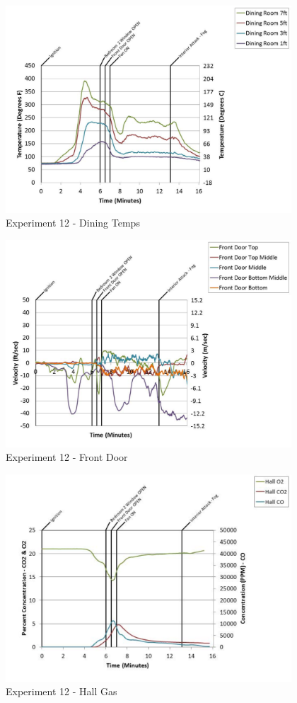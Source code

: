 \documentclass{article}
\begin{document}
\begin{appendices}
	\begin{figure}[h!]
		\centering
		\includegraphics[height=3.05in]{0_Images/Results_Charts/Exp_12_Charts/DiningTemps.pdf}
		\caption{Experiment 12 - Dining Temps}
	\end{figure}
 
	\clearpage

	\begin{figure}[h!]
		\centering
		\includegraphics[height=3.05in]{0_Images/Results_Charts/Exp_12_Charts/FrontDoor.pdf}
		\caption{Experiment 12 - Front Door}
	\end{figure}
 

	\begin{figure}[h!]
		\centering
		\includegraphics[height=3.05in]{0_Images/Results_Charts/Exp_12_Charts/HallGas.pdf}
		\caption{Experiment 12 - Hall Gas}
	\end{figure}
 

\end{appendices}
\end{document}
